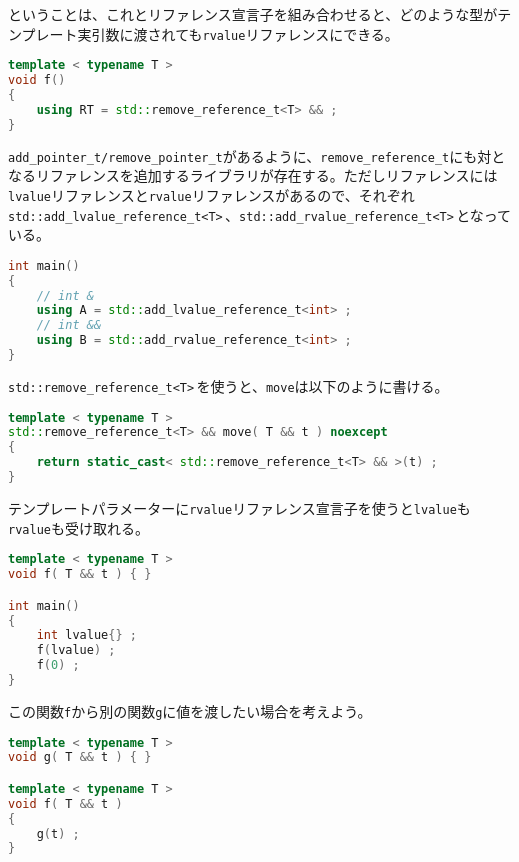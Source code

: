 ということは、これとリファレンス宣言子を組み合わせると、どのような型がテンプレート実引数に渡されても\texttt{rvalue}リファレンスにできる。

\begin{lstlisting}[language={C++}]
template < typename T >
void f()
{
    using RT = std::remove_reference_t<T> && ;
}
\end{lstlisting}

\texttt{add\_pointer\_t/remove\_pointer\_t}があるように、\texttt{remove\_reference\_t}にも対となるリファレンスを追加するライブラリが存在する。ただしリファレンスには\texttt{lvalue}リファレンスと\texttt{rvalue}リファレンスがあるので、それぞれ\texttt{std::add\_lvalue\_reference\_t<T>}\,、\texttt{std::add\_rvalue\_reference\_t<T>}\,となっている。

\ifTombow\pagebreak\fi
\begin{lstlisting}[language={C++}]
int main()
{
    // int &
    using A = std::add_lvalue_reference_t<int> ;
    // int &&
    using B = std::add_rvalue_reference_t<int> ;
}
\end{lstlisting}


\texttt{std::remove\_reference\_t<T>}\,を使うと、\texttt{move}は以下のように書ける。

\begin{lstlisting}[language={C++}]
template < typename T >
std::remove_reference_t<T> && move( T && t ) noexcept
{
    return static_cast< std::remove_reference_t<T> && >(t) ;
}
\end{lstlisting}


テンプレートパラメーターに\texttt{rvalue}リファレンス宣言子を使うと\texttt{lvalue}も\texttt{rvalue}も受け取れる。

\begin{lstlisting}[language={C++}]
template < typename T >
void f( T && t ) { }

int main()
{
    int lvalue{} ;
    f(lvalue) ;
    f(0) ;
}
\end{lstlisting}

この関数\texttt{f}から別の関数\texttt{g}に値を渡したい場合を考えよう。

\begin{lstlisting}[language={C++}]
template < typename T >
void g( T && t ) { }

template < typename T >
void f( T && t )
{
    g(t) ;
}
\end{lstlisting}


